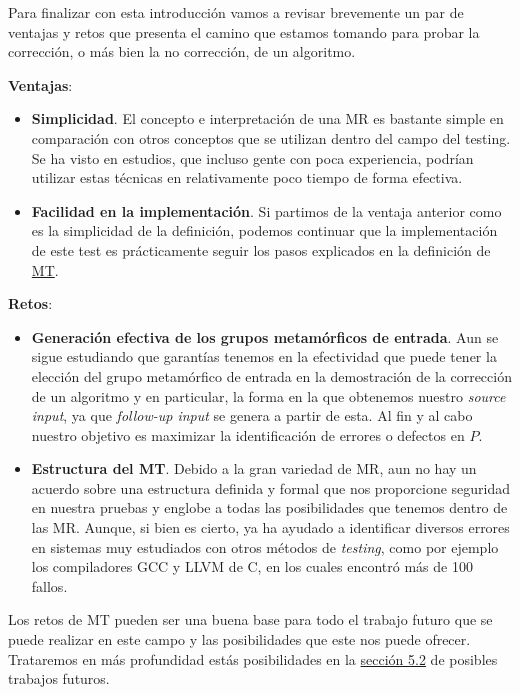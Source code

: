 Para finalizar con esta introducción vamos a revisar brevemente un par de ventajas y retos que presenta el camino que estamos tomando para probar la corrección, o más bien la no corrección, de un algoritmo. \newline

\textbf{Ventajas}:
\begin{itemize}
    \item \textbf{Simplicidad}. El concepto e interpretación de una MR es bastante simple en comparación con otros conceptos que se utilizan dentro del campo del testing. Se ha visto en estudios, que incluso gente con poca experiencia, podrían utilizar estas técnicas en relativamente poco tiempo de forma efectiva.\cite{AR:MTmain:2008} \cite{Note:MT55} \cite{Note:MT73}
    \item \textbf{Facilidad en la implementación}. Si partimos de la ventaja anterior como es la simplicidad de la definición, podemos continuar que la implementación de este test es prácticamente seguir los pasos explicados en la definición de \hyperref[Def:MT]{MT}.
\end{itemize}

\vspace{10pt}

\textbf{Retos}:
\begin{itemize}
    \item \textbf{Generación efectiva de los grupos metamórficos de entrada}. Aun se sigue estudiando que garantías tenemos en la efectividad que puede tener la elección del grupo metamórfico de entrada en la demostración de la corrección de un algoritmo y en particular, la forma en la que obtenemos nuestro \textit{source input}, ya que \textit{follow-up input} se genera a partir de esta. Al fin y al cabo nuestro objetivo es maximizar la identificación de errores o defectos en $P$.
    
    \item \textbf{Estructura del MT}. Debido a la gran variedad de MR, aun no hay un acuerdo sobre una estructura definida y formal que nos proporcione seguridad en nuestra pruebas y englobe a todas las posibilidades que tenemos dentro de las MR. Aunque, si bien es cierto, ya ha ayudado a identificar diversos errores en sistemas muy estudiados con otros métodos de \textit{testing}, como por ejemplo los compiladores GCC y LLVM de C, en los cuales encontró más de 100 fallos.\cite{AR:MTmain:2008} \cite{Note:MT50} \cite{Note:MT51} \cite{Note:MT78}
\end{itemize}

Los retos de MT pueden ser una buena base para todo el trabajo futuro que se puede realizar en este campo y las posibilidades que este nos puede ofrecer. Trataremos en más profundidad estás posibilidades en la \hyperref[Sec5.2:Futuro]{sección 5.2} de posibles trabajos futuros.




